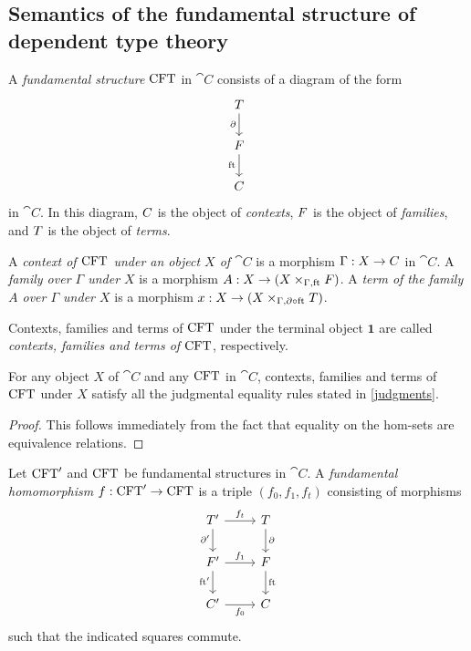 \subsection{Semantics of the fundamental structure of dependent type theory}

\begin{defn}
A \emph{fundamental structure} $\mathrm{CFT}$ in $\cat{C}$ consists of a diagram of the form
\begin{equation*}
\begin{tikzcd}
\stesyst
  \ar{d}[swap]{\ebd}
  \\
\stesysf
  \ar{d}[swap]{\eft}
  \\
\stesysc
\end{tikzcd}
\end{equation*}
in $\cat{C}$. In this diagram, $C$ is the object of \emph{contexts}, $F$ is
the object of \emph{families}, and $T$ is the object of \emph{terms}.
\end{defn}

\begin{defn}
A \emph{context of $\mathrm{CFT}$ under an object $X$ of $\cat{C}$} is a morphism $\Gamma:X\to C$ in
$\cat{C}$. A \emph{family over $\Gamma$ under $X$} is a morphism
$A:X\to (\pullback{X}{\stesysf}{\Gamma}{\eft})$. A 
\emph{term of the family $A$ over $\Gamma$ under $X$}
is a morphism $x:X\to(\pullback{X}{\stesyst}{\Gamma}{\ebd\circ\eft})$.

Contexts, families and terms of $\mathrm{CFT}$ under the terminal object $\mathbf{1}$
are called \emph{contexts, families and terms of $\mathrm{CFT}$}, respectively.
\end{defn}

\begin{lem}
For any object $X$ of $\cat{C}$ and any $\mathrm{CFT}$ in $\cat{C}$, contexts,
families and terms of $\mathrm{CFT}$ under $X$ satisfy all the judgmental equality 
rules stated in \autoref{judgments}.
\end{lem}

\begin{proof}
This follows immediately from the fact that equality on the hom-sets are
equivalence relations.
\end{proof}

\begin{defn}
Let $\mathrm{CFT}'$ and $\mathrm{CFT}$ be fundamental structures in $\cat{C}$. A
\emph{fundamental homomorphism} $f:\mathrm{CFT}'\to\mathrm{CFT}$ is a triple 
$(f_0,f_1,f_t)$ consisting of morphisms
\begin{equation*}
\begin{tikzcd}
\stesyst' 
  \ar{r}{f_t}
  \ar{d}[swap]{\ebd'}
  &
\stesyst
  \ar{d}{\ebd}
  \\
\stesysf'
  \ar{r}{f_1}
  \ar{d}[swap]{\eft'}
  &
\stesysf
  \ar{d}{\eft}
  \\
\stesysc' 
  \ar{r}[swap]{f_0}
  &
\stesysc
\end{tikzcd}
\end{equation*}
such that the indicated squares commute.
\end{defn}

